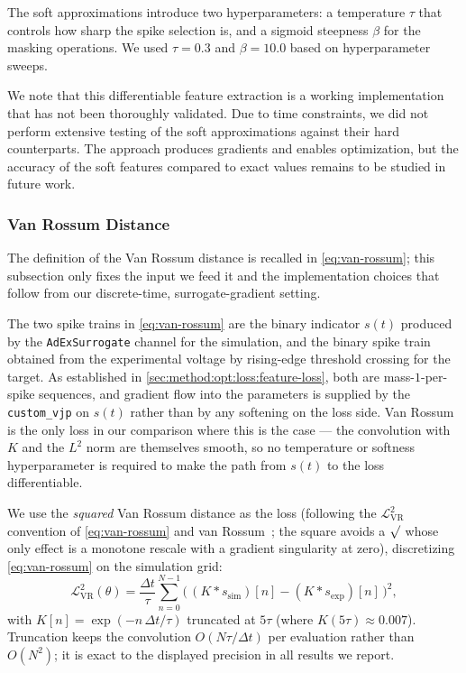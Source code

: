 The soft approximations introduce two hyperparameters: a temperature $\tau$ that controls how sharp the spike selection is, and a sigmoid steepness $\beta$ for the masking operations.
We used $\tau = 0.3$ and $\beta = 10.0$ based on hyperparameter sweeps.

We note that this differentiable feature extraction is a working implementation that has not been thoroughly validated.
Due to time constraints, we did not perform extensive testing of the soft approximations against their hard counterparts.
The approach produces gradients and enables optimization, but the accuracy of the soft features compared to exact values remains to be studied in future work.

\subsubsection{Van Rossum Distance}\label{sec:method:opt:loss:van-rossum}
The definition of the Van Rossum distance is recalled in \cref{eq:van-rossum};
this subsection only fixes the input we feed it and the implementation choices that follow from our discrete-time, surrogate-gradient setting.

The two spike trains in \cref{eq:van-rossum} are the binary indicator $s(t)$ produced by the \texttt{AdExSurrogate} channel for the simulation, and the binary spike train obtained from the experimental voltage by rising-edge threshold crossing for the target.
As established in \cref{sec:method:opt:loss:feature-loss}, both are mass-$1$-per-spike sequences, and gradient flow into the parameters is supplied by the \texttt{custom\_vjp} on $s(t)$ rather than by any softening on the loss side.
Van Rossum is the only loss in our comparison where this is the case --- the convolution with $K$ and the $L^2$ norm are themselves smooth, so no temperature or softness hyperparameter is required to make the path from $s(t)$ to the loss differentiable.

We use the \emph{squared} Van Rossum distance as the loss (following the $\mathcal{L}_{\mathrm{VR}}^{2}$ convention of \cref{eq:van-rossum} and van Rossum~\cite{Rossum2001}; the square avoids a $\surd$ whose only effect is a monotone rescale with a gradient singularity at zero), discretizing \cref{eq:van-rossum} on the simulation grid:
\begin{equation}\label{eq:vr-discrete}
    \mathcal{L}_{\mathrm{VR}}^{2}(\theta) = \frac{\Delta t}{\tau} \sum_{n=0}^{N-1} \bigl(\,(K * s_{\mathrm{sim}})[n] - (K * s_{\mathrm{exp}})[n]\,\bigr)^{2},
\end{equation}
with $K[n] = \exp(-n\,\Delta t / \tau)$ truncated at $5\tau$ (where $K(5\tau) \approx 0.007$).
Truncation keeps the convolution $O(N\tau/\Delta t)$ per evaluation rather than $O(N^{2})$; it is exact to the displayed precision in all results we report.

